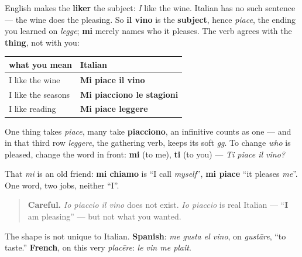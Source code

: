 \begin{grammarlens}[title={Grammar Lens: the thing you like is the subject}]
English makes the \textbf{liker} the subject: \emph{I} like the wine. Italian has no such sentence — the wine does the pleasing. So \textbf{il vino} is the \textbf{subject}, hence \emph{piace}, the ending you learned on \emph{legge}; \textbf{mi} merely names who it pleases. The verb agrees with the \textbf{thing}, not with you:

\noindent
\begin{tabularx}{\linewidth}{@{}>{\raggedright\arraybackslash}X>{\raggedright\arraybackslash}X@{}}
\toprule
\textbf{what you mean} & \textbf{Italian} \\
\midrule
I like the wine & \textbf{Mi piace il vino} \\
I like the seasons & \textbf{Mi piacciono le stagioni} \\
I like reading & \textbf{Mi piace leggere} \\
\bottomrule
\end{tabularx}

One thing takes \emph{piace}, many take \textbf{piacciono}, an infinitive counts as one — and in that third row \emph{leggere}, the gathering verb, keeps its soft \emph{gg}. To change \emph{who} is pleased, change the word in front: \textbf{mi} (to me), \textbf{ti} (to you) — \emph{Ti piace il vino?}

That \emph{mi} is an old friend: \textbf{mi chiamo} is \textquotedblleft{}I call \emph{myself}\textquotedblright{}, \textbf{mi piace} \textquotedblleft{}it pleases \emph{me}\textquotedblright{}. One word, two jobs, neither \textquotedblleft{}I\textquotedblright{}.

\begin{quote}
\textbf{Careful.} \emph{Io piaccio il vino} does not exist. \emph{Io piaccio} is real Italian — \textquotedblleft{}\textbf{I} am pleasing\textquotedblright{} — but not what you wanted.
\end{quote}

The shape is not unique to Italian. \textbf{Spanish}: \emph{me gusta el vino}, on \emph{gustāre}, \textquotedblleft{}to taste.\textquotedblright{} \textbf{French}, on this very \emph{placēre}: \emph{le vin me plaît}.
\end{grammarlens}

